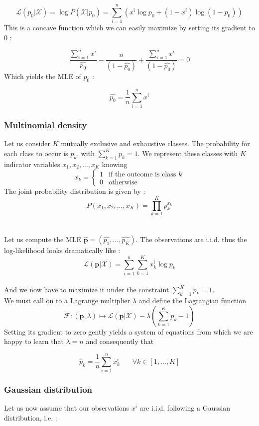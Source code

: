 \documentclass[a4paper,12pt]{article}
\begin{document}
\[\mathcal{L}(p_0|\mathcal{X})=\log{P(\mathcal{X}|p_0)}=\sum_{i=1}^n\left(x^i\log p_0 + (1-x^i)\log{(1-p_0)}\right)\]
This is a concave function which we can easily maximize by setting its gradient to 0 :

\[\frac{\sum_{i=1}^nx^i}{\hat{p_0}}-\frac{n}{(1-\hat{p_0})}+\frac{\sum_{i=1}^nx^i}{(1-\hat{p_0})}= 0
\]
Which yields the MLE of $p_0$ :

\[\hat{p_0}=\frac{1}{n}\sum_{i=1}^nx^i\]


\subsubsection{Multinomial density}

Let us consider $K$ mutually exclusive and exhaustive classes. The probability for each class to occur is $p_k$, with $\sum_{k=1}^Kp_k=1$. We represent these classes with $K$ indicator variables $x_1, x_2, \dots, x_K$ knowing
\[
    x_k=
\begin{cases}
    1& \text{if the outcome is class } k\\
    0              & \text{otherwise}
\end{cases}
\]
The joint probability distribution is given by :
\[P(x_1,x_2,\dots,x_K)=\displaystyle\prod_{k=1}^{K}p_k^{x_k}\]\\
\\
Let us compute the MLE $\bm{\hat{p}}=(\hat{p_1},\dots,\hat{p_K})$. The observations are i.i.d. thus the log-likelihood looks dramatically like :
\\
\[\mathcal{L}(\bm p|\mathcal{X})=\sum_{i=1}^n\sum_{k=1}^K x_k^i\log p_k
\]\\
And we now have to maximize it under the constraint $\displaystyle\sum_{k=1}^Kp_k=1$.\\
We must call on to a Lagrange multiplier $\lambda$ and define the Lagrangian function
\[\mathcal{F} : (\bm p, \lambda) \mapsto \mathcal{L}(\bm p|\mathcal{X})-\lambda \left(\sum_{k=1}^Kp_k - 1\right)\]
Setting its gradient to zero gently yields a system of equations from which we are happy to learn that $\lambda=n$ and consequently that

\[\hat{p}_k=\dfrac{1}{n}\displaystyle\sum_{i=1}^nx_k^i\ \ \ \ \ \ \ \ \forall k \in [1,\dots,K]\]


\subsubsection{Gaussian distribution}

Let us now assume that our observations $x^i$ are i.i.d. following a Gaussian distribution, i.e. :
\end{document}
